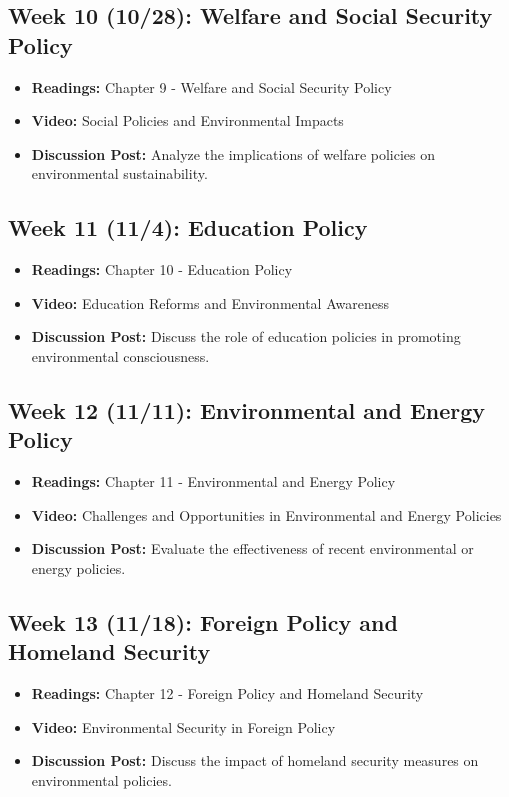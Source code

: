 \documentclass[12pt, letterpaper]{article}
\begin{document}
\subsection*{Week 10 (10/28): Welfare and Social Security Policy}
\begin{itemize}
    \item \textbf{Readings:} Chapter 9 - Welfare and Social Security Policy
    \item \textbf{Video:} Social Policies and Environmental Impacts
    \item \textbf{Discussion Post:} Analyze the implications of welfare policies on environmental sustainability.
\end{itemize}

\subsection*{Week 11 (11/4): Education Policy}
\begin{itemize}
    \item \textbf{Readings:} Chapter 10 - Education Policy
    \item \textbf{Video:} Education Reforms and Environmental Awareness
    \item \textbf{Discussion Post:} Discuss the role of education policies in promoting environmental consciousness.
\end{itemize}

\subsection*{Week 12 (11/11): Environmental and Energy Policy}
\begin{itemize}
    \item \textbf{Readings:} Chapter 11 - Environmental and Energy Policy
    \item \textbf{Video:} Challenges and Opportunities in Environmental and Energy Policies
    \item \textbf{Discussion Post:} Evaluate the effectiveness of recent environmental or energy policies.
\end{itemize}

\subsection*{Week 13 (11/18): Foreign Policy and Homeland Security}
\begin{itemize}
    \item \textbf{Readings:} Chapter 12 - Foreign Policy and Homeland Security
    \item \textbf{Video:} Environmental Security in Foreign Policy
    \item \textbf{Discussion Post:} Discuss the impact of homeland security measures on environmental policies.
\end{itemize}
\end{document}
